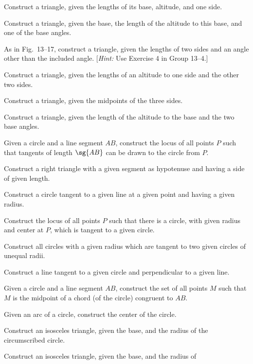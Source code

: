 \documentclass[11pt]{book}
\theoremstyle{bkplain}
\theoremstyle{XIplainnote}
\theoremstyle{bkplain}
\theoremstyle{bkplain}
\begin{document}
\begin{exercisecols}
\begin{exlist}
\item Construct a triangle, given the lengths of its base, altitude, and one
      side.
\item Construct a triangle, given the base, the length of the altitude to this
      base, and one of the base angles.
\item[\stex 3.] As in Fig.~13--17, construct a triangle, given the lengths of
      two sides and an angle other than the included angle. [\emph{Hint:} Use
      Exercise 4 in Group 13--4.]
\exfig{\FIGXIIISEVENTEEN}
\item[4.] Construct a triangle, given the lengths of an altitude to one side and
      the other two sides.
\item[5.] Construct a triangle, given the midpoints of the three sides.
\item[6.] Construct a triangle, given the length of the altitude to the base and
      the two base angles.
\item[7.] Given a circle and a line segment $AB$, construct the locus of all
      points $P$ such that tangents of length $\sg{AB}$ can be drawn to the
      circle from $P$.
\item[8.] Construct a right triangle with a given segment as hypotenuse and
      having a side of given length.
\item[9.] Construct a circle tangent to a given line at a given point and having
      a given radius.
\item[10.] Construct the locus of all points $P$ such that there is a circle,
      with given radius and center at $P$, which is tangent to a given circle.
\item[11.] Construct all circles with a given radius which are tangent to two
      given circles of unequal radii.
\item[12.] Construct a line tangent to a given circle and perpendicular to a
      given line.
\item[13.] Given a circle and a line segment $AB$, construct the set of all
      points $M$ such that $M$ is the midpoint of a chord (of the circle)
      congruent to $AB$.
\item[14.] Given an arc of a circle, construct the center of the circle.
\item[15.] Construct an isosceles triangle, given the base, and the radius of
      the circumscribed circle.
\item[16.] Construct an isosceles triangle, given the base, and the radius of

\end{exlist}
\end{exercisecols}
\end{document}
